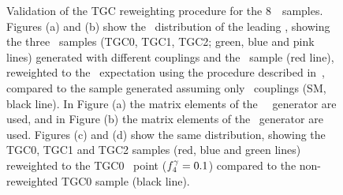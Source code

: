 \begin{figure}[htbp]
\begin{center}
\caption[Validation of the TGC reweighting procedure for the 8~\tev\ samples.]{
\small
Validation of the TGC reweighting procedure for the 8~\tev\ samples. Figures (a) and (b) show the \pt\
distribution of the leading \leppair, showing the three \TGC\ samples (TGC0,
TGC1, TGC2; green, blue and pink lines) generated with different couplings and
the \sm\ sample (red line), reweighted to the \sm\
expectation using the procedure described in~, compared to the sample
generated assuming only \sm\ couplings (SM, black line). In Figure (a) the matrix elements
of the \BR\ \mc\ generator are used, and in Figure (b) the matrix elements of
the \BHO\ generator are used. Figures (c) and (d) show the same distribution,
showing the TGC0, TGC1 and TGC2 samples (red, blue and green lines) reweighted to the TGC0 \TGC\ point
($f_{4}^{\gamma}=0.1$) compared to the non-reweighted TGC0 sample (black line).
 }
\label{fig:TGC-reweight}
\end{center}
\end{figure}

